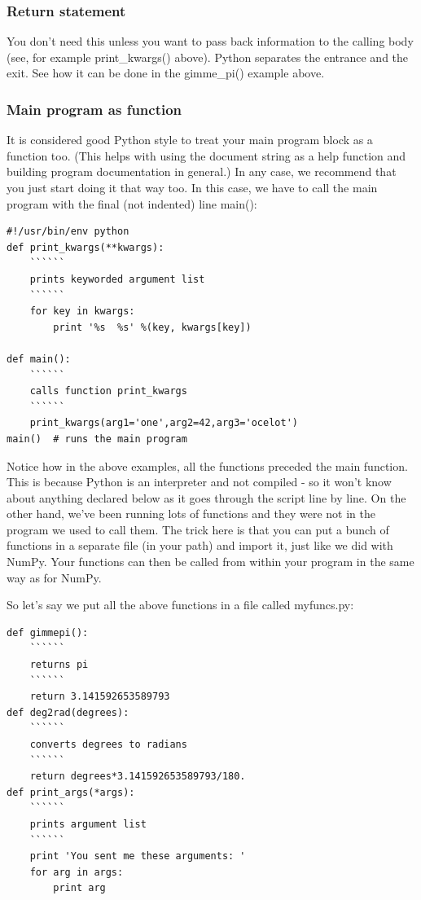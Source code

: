 \documentclass[11pt]{book}
\begin{document}
{{ \subsubsection{Return statement}
 You don't need this unless you want to pass back information to the calling body (see, for example {\color{blue}print\_kwargs()} above).  Python separates the entrance and the exit.  See how it can be done in the {\color{blue}gimme\_pi()} example above.

 \subsubsection{Main program as function}

 It is considered good Python style to treat your main program block as a function too.  (This helps with using the document string as a help function and building program documentation in general.)  In any case, we recommend that you just start doing it that way too.  In this case,  we have to call the main program with the final (not indented) line {\color{blue}main()}:

{ \color{blue} \begin{verbatim}
#!/usr/bin/env python
def print_kwargs(**kwargs):
    ``````
    prints keyworded argument list
    ``````
    for key in kwargs:
        print '%s  %s' %(key, kwargs[key])

def main():
    ``````
    calls function print_kwargs
    ``````
    print_kwargs(arg1='one',arg2=42,arg3='ocelot')
main()  # runs the main program
\end{verbatim}}

Notice how in the above examples, all the functions preceded the main function.  This is because Python is an interpreter and not compiled - so it won't know about anything declared below as it goes through the script line by line.   On the other hand, we've been running lots of functions and they were not in the program we used to call them.  The trick here is that
you can put a bunch of functions in a separate file (in your path) and import it, just like we did with {\color{blue}NumPy}.  Your functions can then be called from within your program  in the same way as for {\color{blue}NumPy}.

So let's say we put all the above functions in a file called {\color{blue}myfuncs.py}:

{ \color{blue} \begin{verbatim}
def gimmepi():
    ``````
    returns pi
    ``````
    return 3.141592653589793
def deg2rad(degrees):
    ``````
    converts degrees to radians
    ``````
    return degrees*3.141592653589793/180.
def print_args(*args):
    ``````
    prints argument list
    ``````
    print 'You sent me these arguments: '
    for arg in args:
        print arg
\end{verbatim}}

}}
\end{document}
